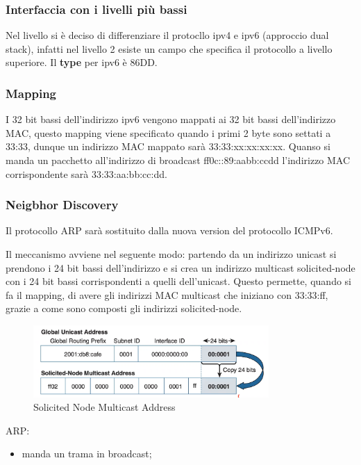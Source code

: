 \documentclass[12pt]{article}
\begin{document}
\subsubsection{Interfaccia con i livelli pi\`u bassi}
Nel livello si \`e deciso di differenziare il protocllo ipv4 e ipv6 (approccio dual stack), infatti nel livello 2 esiste un campo che specifica il protocollo a livello superiore. Il \textbf{type} per ipv6 \`e 86DD.

\subsubsection{Mapping}
I 32 bit bassi dell'indirizzo ipv6 vengono mappati ai 32 bit bassi dell'indirizzo MAC, questo mapping viene specificato quando i primi 2 byte sono settati a 33:33, dunque un indirizzo MAC mappato sar\`a 33:33:xx:xx:xx:xx. Quanso si manda un pacchetto all'indirizzo di broadcast ff0c::89:aabb:ccdd l'indirizzo MAC corrispondente sar\`a 33:33:aa:bb:cc:dd.

\subsubsection{Neigbhor Discovery}
Il protocollo ARP sar\`a sostituito dalla nuova version del protocollo ICMPv6.

Il meccanismo avviene nel seguente modo: partendo da un indirizzo unicast si prendono i 24 bit bassi dell'indirizzo e si crea un indirizzo multicast solicited-node con i 24 bit bassi corrispondenti a quelli dell'unicast. Questo permette, quando si fa il mapping, di avere gli indirizzi MAC multicast che iniziano con 33:33:ff, grazie a come sono composti gli indirizzi solicited-node.
\begin{figure}[H]
    \centering
    \includegraphics[width=0.8\textwidth]{solicited-node-multicast-address.png}
    \caption{Solicited Node Multicast Address}
    \label{fig:solicited-node-multicast-address}
\end{figure}

ARP:
\begin{itemize}
    \item manda un trama in broadcast;
\end{itemize}
\end{document}
